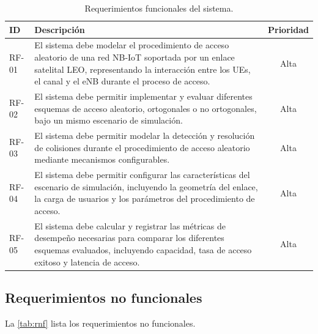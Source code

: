 \begin{table}[H]
\centering
\caption{Requerimientos funcionales del sistema.}
\label{tab:rf}
\small
\begin{tabularx}{\textwidth}{@{}l X c@{}}
\toprule
\textbf{ID} & \textbf{Descripción} & \textbf{Prioridad} \\
\midrule

RF-01 & El sistema debe modelar el procedimiento de acceso aleatorio de una red NB-IoT soportada por un enlace satelital LEO, representando la interacción entre los UEs, el canal y el eNB durante el proceso de acceso. & Alta \\

\addlinespace

RF-02 & El sistema debe permitir implementar y evaluar diferentes esquemas de acceso aleatorio, ortogonales o no ortogonales, bajo un mismo escenario de simulación. & Alta \\

\addlinespace

RF-03 & El sistema debe permitir modelar la detección y resolución de colisiones durante el procedimiento de acceso aleatorio mediante mecanismos configurables. & Alta \\

\addlinespace

RF-04 & El sistema debe permitir configurar las características del escenario de simulación, incluyendo la geometría del enlace, la carga de usuarios y los parámetros del procedimiento de acceso. & Alta \\

\addlinespace

RF-05 & El sistema debe calcular y registrar las métricas de desempeño necesarias para comparar los diferentes esquemas evaluados, incluyendo capacidad, tasa de acceso exitoso y latencia de acceso. & Alta \\

\bottomrule
\end{tabularx}
\end{table}

\subsection{Requerimientos no funcionales}
\label{sec:rnf}

La \cref{tab:rnf} lista los requerimientos no funcionales.

